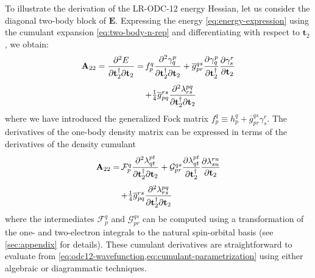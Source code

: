 To illustrate the derivation of the LR-ODC-12 energy Hessian, let us consider
the diagonal two-body block of \(\mathbf{E}\).
Expressing the energy \eqref{eq:energy-expression} using the cumulant expansion
\eqref{eq:two-body-n-rep} and differentiating with respect to $\mathbf{t}_2$, we
obtain:
\begin{equation}
    \label{eq:odc12-hessian-initial-form}
    \begin{array}{r@{\,}l}
        \mathbf{A}_{22}
        =
        \dfrac{\partial^2 E}{%
            \partial\mathbf{t}_2^\dagger
            \partial\mathbf{t}_2
        }
        =
        &
        f_p^q
        \dfrac{\partial^2 \gamma^p_q}{%
            \partial\mathbf{t}_2^\dagger
            \partial\mathbf{t}_2
        }
        +
        \overline{g}_{pr}^{qs}
        \dfrac{\partial \gamma^p_q}{\partial\mathbf{t}_2^\dagger}
        \dfrac{\partial \gamma^r_s}{\partial\mathbf{t}_2}
        \\[15pt]
        &
        +
        \tfrac{1}{4}
        \overline{g}_{pq}^{rs}
        \dfrac{\partial^2 \lambda^{pq}_{rs}}{%
            \partial\mathbf{t}_2^\dagger
            \partial\mathbf{t}_2
        }
    \end{array}
\end{equation}
where we have introduced the generalized Fock matrix
\(
    f_p^q
    \equiv
    h_p^q
    +
    \overline{g}_{pr}^{qs}
    \gamma^r_s
\).
The derivatives of the one-body density matrix can be expressed in terms of the derivatives of the density cumulant
\begin{equation}
    \begin{array}{r@{\,}l}
    \label{eq:a22_odc12}
	\mathbf{A}_{22}
        =
        &
        \mathcal{F}_p^q
        \dfrac{\partial^2 \lambda^{pt}_{qt}}{%
            \partial\mathbf{t}_2^\dagger
            \partial\mathbf{t}_2
        }
        +
        \mathcal{G}_{pr}^{qs}
        \dfrac{\partial \lambda^{pt}_{qt}}{\partial\mathbf{t}_2^\dagger}
        \dfrac{\partial \lambda^{ru}_{su}}{\partial\mathbf{t}_2}
        \\[15pt]
        &
        +
        \tfrac{1}{4}
        \overline{g}_{pq}^{rs}
        \dfrac{\partial^2 \lambda^{pq}_{rs}}{%
            \partial\mathbf{t}_2^\dagger
            \partial\mathbf{t}_2
        }
    \end{array}
\end{equation}
where the intermediates $\mathcal{F}_p^q$ and $\mathcal{G}_{pr}^{qs}$ can be computed using a transformation of the one- and two-electron integrals to the natural spin-orbital basis (see \cref{sec:appendix} for details).
These cumulant derivatives are straightforward to evaluate from \cref{eq:odc12-wavefunction,eq:cumulant-parametrization} using either algebraic or diagrammatic techniques. 

